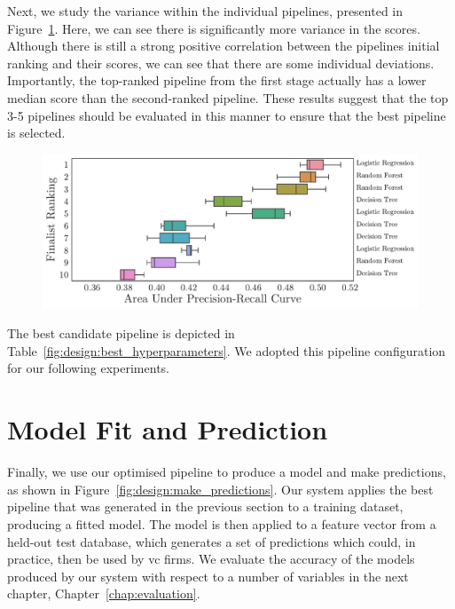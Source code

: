 \documentclass[../thesis/thesis.tex]{subfiles}
\begin{document}
Next, we study the variance within the individual pipelines, presented in Figure~\ref{fig:design:selection_agg_rank}. Here, we can see there is significantly more variance in the scores. Although there is still a strong positive correlation between the pipelines initial ranking and their scores, we can see that there are some individual deviations. Importantly, the top-ranked pipeline from the first stage actually has a lower median score than the second-ranked pipeline. These results suggest that the top 3-5 pipelines should be evaluated in this manner to ensure that the best pipeline is selected.

\begin{figure}[!htb]
    \centering
    \includegraphics[width=\textwidth]{../figures/design/selection_agg_rank}
    \caption[Overview of finalist pipeline performance]{}
    \label{fig:design:selection_agg_rank}
\end{figure}

The best candidate pipeline is depicted in Table~\ref{fig:design:best_hyperparameters}. We adopted this pipeline configuration for our following experiments.

\begin{table}[!htb]
    \centering
    \scalebox{0.8}{}
    \caption[Hyperparameters of best pipeline]{}
    \label{fig:design:best_hyperparameters}
\end{table}

\section{Model Fit and Prediction}

Finally, we use our optimised pipeline to produce a model and make predictions, as shown in Figure~\ref{fig:design:make_predictions}. Our system applies the best pipeline that was generated in the previous section to a training dataset, producing a fitted model. The model is then applied to a feature vector from a held-out test database, which generates a set of predictions which could, in practice, then be used by \gls{vc} firms. We evaluate the accuracy of the models produced by our system with respect to a number of variables in the next chapter, Chapter~\ref{chap:evaluation}.
\end{document}
